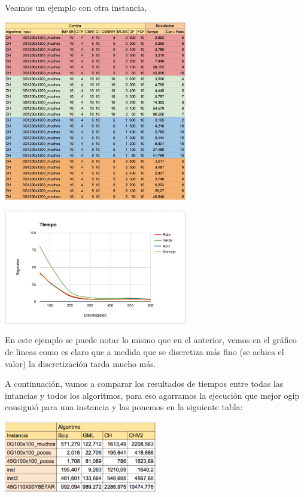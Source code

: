 \newpage

Veamos un ejemplo con otra instancia,

\begin{center}
\includegraphics[width=0.6\textwidth]{imagenes/tabla6}
\end{center}


\begin{center}
\includegraphics[width=0.6\textwidth]{imagenes/grafico6}
\end{center}


En este ejemplo se puede notar lo mismo que en el anterior, vemos en el gr\'afico de lineas como es claro que a medida que se discretiza m\'as fino (se achica el valor) la discretizaci\'on tarda mucho m\'as. 

A continuaci\'on, vamos a comparar los resultados de tiempos entre todas las intancias y todos los algoritmos, para eso agarramos la ejecuci\'on que mejor ogip consigui\'o para una instancia y las ponemos en la siguiente tabla:

\begin{center}
\includegraphics[width=0.5\textwidth]{imagenes/tabla10}
\end{center}

